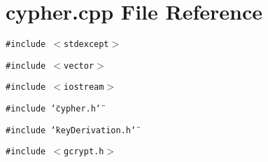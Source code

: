 \section{cypher.cpp File Reference}
\label{cypher_8cpp}
{\tt \#include $<$stdexcept$>$}\par
{\tt \#include $<$vector$>$}\par
{\tt \#include $<$iostream$>$}\par
{\tt \#include \char`\"{}cypher.h\char`\"{}}\par
{\tt \#include \char`\"{}key\-Derivation.h\char`\"{}}\par
{\tt \#include $<$gcrypt.h$>$}\par
